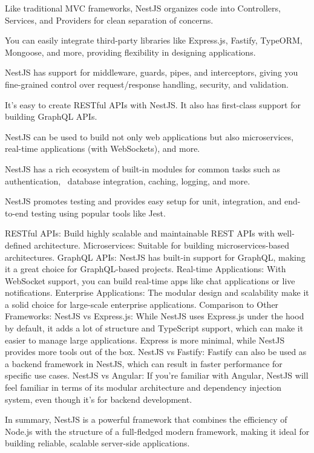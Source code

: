 
Like traditional MVC frameworks, NestJS organizes code into Controllers, Services, and Providers for clean separation of concerns.


You can easily integrate third-party libraries like Express.js, Fastify, TypeORM, Mongoose, and more, 
providing flexibility in designing applications.

NestJS has support for middleware, guards, pipes, and interceptors, 
giving you fine-grained control over request/response handling, security, and validation.


It’s easy to create RESTful APIs with NestJS. 
It also has first-class support for building GraphQL APIs.


NestJS can be used to build not only web applications but also microservices, 
real-time applications (with WebSockets), and more.


NestJS has a rich ecosystem of built-in modules for common tasks such as authentication, \
database integration, caching, logging, and more.


NestJS promotes testing and provides easy setup for unit, integration, 
and end-to-end testing using popular tools like Jest.


RESTful APIs:       Build highly scalable and maintainable REST APIs with well-defined architecture.
Microservices:      Suitable for building microservices-based architectures.
GraphQL APIs:       NestJS has built-in support for GraphQL, making it a great choice for GraphQL-based projects.
Real-time Applications:    With WebSocket support, you can build real-time apps like chat applications or live notifications.
Enterprise Applications:   The modular design and scalability make it a solid choice for large-scale enterprise applications.
Comparison to Other Frameworks:    NestJS vs Express.js: While NestJS uses Express.js under the hood by default, it adds a lot of structure and TypeScript support, 
                                   which can make it easier to manage large applications. Express is more minimal, while NestJS provides more tools out of the box.
NestJS vs Fastify:   Fastify can also be used as a backend framework in NestJS, which can result in faster performance for specific use cases.
NestJS vs Angular:   If you're familiar with Angular, NestJS will feel familiar in terms of its modular architecture and dependency injection system, 
                     even though it's for backend development.


In summary, NestJS is a powerful framework that combines the efficiency of Node.js with the structure of a full-fledged modern framework, 
making it ideal for building reliable, scalable server-side applications.